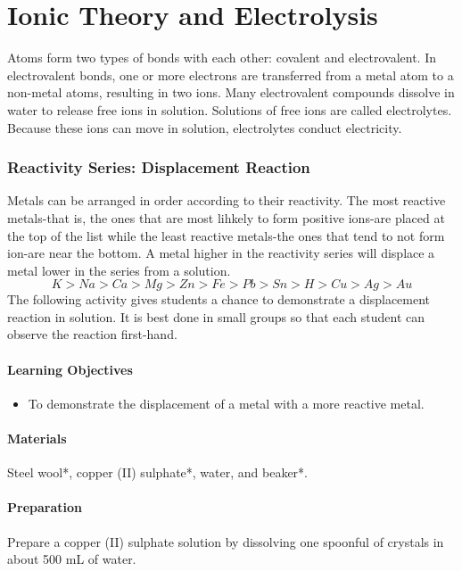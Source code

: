 \chapter{Ionic Theory and Electrolysis}

Atoms form two types of bonds with each other: covalent and electrovalent. In electrovalent bonds, one or more electrons are transferred from a metal atom to a non-metal atoms, resulting in two ions. Many electrovalent compounds dissolve in water to release free ions in solution. Solutions of free ions are called electrolytes. Because these ions can move in solution, electrolytes conduct electricity.

\subsection{Reactivity Series: Displacement Reaction}

Metals can be arranged in order according to their reactivity. The most reactive metals-that is, the ones that are most lihkely to form positive ions-are placed at the top of the list while the least reactive metals-the ones that tend to not form ion-are near the bottom. A metal higher in the reactivity series will displace a metal lower in the series from a solution. 
$$K>Na>Ca>Mg>Zn>Fe>Pb>Sn>H>Cu>Ag>Au$$
The following activity gives students a chance to demonstrate a displacement reaction in solution. It is best done in small groups so that each student can observe the reaction first-hand.
\subsubsection*{Learning Objectives}
\begin{itemize}
\item{To demonstrate the displacement of a metal with a more reactive metal.}
\end{itemize}

\subsubsection*{Materials}
Steel wool*, copper (II) sulphate*, water, and beaker*.

\subsubsection*{Preparation}
Prepare a copper (II) sulphate solution by dissolving one spoonful of crystals in about 500 mL of water.

